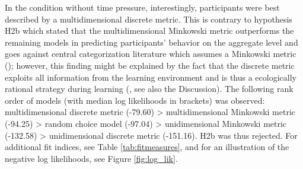 \documentclass[a4paper,man,natbib]{apa6}
\begin{document}
In the condition without time pressure, interestingly, participants were best described by a multidimensional discrete metric. This is contrary to hypothesis H2b which stated that the multidimensional Minkowski metric outperforms the remaining models in predicting participants' behavior on the aggregate level and goes against central categorization literature which assumes a Minkowski metric (\citealp{nosofsky1986attention, nosofsky1989further, nosofsky1994rule, nosofsky1984choice}); however, this finding might be explained by the fact that the discrete metric exploits all information from the learning environment and is thus a ecologically rational strategy during learning (\citealp{todd2007environments}, see also the Discussion).
The following rank order of models (with median log likelihoods in brackets) was observed: multidimensional discrete metric (-79.60) > multidimensional Minkowski metric (-94.25) > random choice model (-97.04) > unidimensional Minkowski metric (-132.58) > unidimensional discrete metric (-151.16). H2b was thus rejected. For additional fit indices, see Table \ref{tab:fitmeasures}, and for an illustration of the negative log likelihoods, see Figure \ref{fig:log_lik}.
\end{document}
